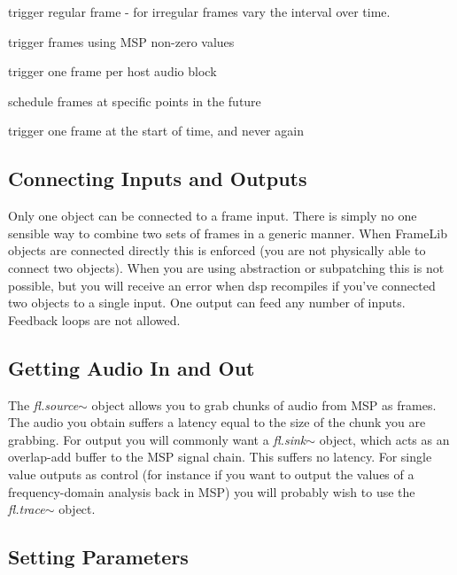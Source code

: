 \documentclass{article}
\newcommand{\flobject}[1]{\textit{fl.#1$\sim$}}
\begin{document}
\begin{description}[align=left, itemindent=3cm, labelwidth=3cm]
\item [\flobject{interval}] trigger regular frame - for irregular frames vary the interval over time.
\item [\flobject{audiotrigger}] trigger frames using MSP non-zero values
\item [\flobject{perblock}] trigger one frame per host audio block
\item [\flobject{future}] schedule frames at specific points in the future
\item [\flobject{once}] trigger one frame at the start of time, and never again
\end{description}

\subsection{Connecting Inputs and Outputs}

Only one object can be connected to a frame input. There is simply no one sensible way to combine two sets of frames in a generic manner.  When FrameLib objects are connected directly this is enforced (you are not physically able to connect two objects). When you are using abstraction or subpatching this is not possible, but you will receive an error when dsp recompiles if you've connected two objects to a single input. One output can feed any number of inputs. Feedback loops are not allowed.

\subsection{Getting Audio In and Out}

The \flobject{source} object allows you to grab chunks of audio from MSP as frames. The audio you obtain suffers a latency equal to the size of the chunk you are grabbing. For output you will commonly want a \flobject{sink} object, which acts as an overlap-add buffer to the MSP signal chain. This suffers no latency. For single value outputs as control (for instance if you want to output the values of a frequency-domain analysis back in MSP) you will probably wish to use the \flobject{trace} object.

\subsection{Setting Parameters}
\end{document}
